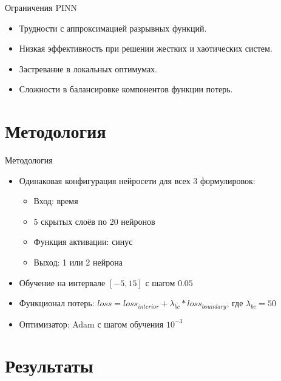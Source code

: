 \documentclass{beamer}
\begin{document}
\begin{frame}{Ограничения PINN}
    \begin{itemize}
        \item Трудности с аппроксимацией разрывных функций.
        \item Низкая эффективность при решении жестких и хаотических систем.
        \item Застревание в локальных оптимумах.
        \item Сложности в балансировке компонентов функции потерь.
    \end{itemize}
\end{frame}

\section{Методология}
\begin{frame}{Методология}
    \begin{itemize}
        \item Одинаковая конфигурация нейросети для всех 3 формулировок:
        \begin{itemize}
            \item Вход: время
            \item 5 скрытых слоёв по 20 нейронов
            \item Функция активации: синус
            \item Выход: 1 или 2 нейрона
        \end{itemize}
        \item Обучение на интервале $[-5, 15]$ с шагом $0.05$
        \item Функционал потерь: $loss = loss_{interior} + \lambda_{bc} * loss_{boundary}$, где $\lambda_{bc} = 50$
        \item Оптимизатор: Adam с шагом обучения $10^{-3}$
    \end{itemize}
\end{frame}

\section{Результаты}
\end{document}
